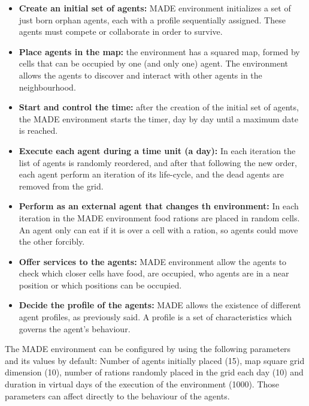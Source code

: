 \documentclass[runningheads]{llncs}
\begin{document}
\begin{itemize}
\item \textbf{Create an initial set of agents:} MADE environment
  initializes a set of just born orphan agents, each with a profile
  sequentially assigned.
 These agents must compete or collaborate in order to survive.
\item \textbf{Place agents in the map:} the environment has a squared map, formed by cells that can be occupied by one (and only one) agent. The environment allows the agents to discover and interact with other agents in the neighbourhood.
\item \textbf{Start and control the time:} after the creation of the initial set of agents, the MADE environment starts the timer, day by day until a maximum date is reached.
\item \textbf{Execute each agent during a time unit (a day):} In each iteration the list of agents is randomly reordered, and after that following the new order, each agent perform an iteration of its life-cycle, and the dead agents are removed from the grid.
\item \textbf{Perform as an external agent that changes th environment:} In each iteration in the MADE environment food rations are placed in random cells. An agent only can eat if it is over a cell with a ration, so agents could move the other forcibly.
\item \textbf{Offer services to the agents:} MADE environment allow the agents to check which closer cells have food, are occupied, who agents are in a near position or which positions can be occupied.
\item \textbf{Decide the profile of the agents:} MADE allows the existence of different agent profiles, as previously said. A profile is a set of characteristics which governs the agent's behaviour.
\end{itemize}

The MADE environment can be configured by using the following parameters and its values by default: Number of agents initially placed (15), map square grid dimension (10), number of rations randomly placed in the grid each day (10) and duration in virtual days of the  execution of the environment (1000). Those parameters can affect directly to the behaviour of the agents.

\end{document}
